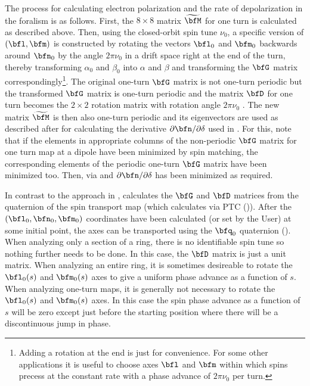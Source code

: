 {The process for calculating electron polarization and the rate of depolarization in the 
foralism is as follows. First, the $8 \times 8$ matrix $\widetilde\bfM$ for one turn is calculated
as described above. Then, using the closed-orbit spin tune $\nu_0$, a specific version of $(\bfl,
\bfm)$ is constructed by rotating the vectors $\bfl_0$ and $ \bfm_0$ backwards around $ \bfn_0$ by
the angle $2\pi \nu_0$ in a drift space right at the end of the turn, thereby transforming
$\alpha_0$ and $\beta_0$ into $\alpha$ and $\beta$ and transforming the $\bfG$ matrix
correspondingly\footnote{Adding a rotation at the end is just for convenience. For some other
applications it is useful to choose axes $ \bfl$ and $ \bfm$ within which spins precess at the
constant rate with a phase advance of $2\pi \nu_0$ per turn.}. The original one-turn $\bfG$ matrix
is not one-turn periodic but the transformed $\bfG$ matrix is one-turn periodic and the matrix
$\bfD$ for one turn becomes the $2 \times 2$ rotation matrix with rotation angle $2\pi \nu_0$
\cite{b:chao.spin}.  The new matrix $\widetilde \bfM$ is then also one-turn periodic and its
eigenvectors are used as described after  for calculating the derivative ${\partial
\bfn}/\partial \delta$ used in .  For this, note that if the elements in appropriate
columns of the non-periodic $\bfG$ matrix for one turn map at a dipole have been minimized by spin
matching, the corresponding elements of the periodic one-turn $\bfG$ matrix have been minimized
too. Then, via  and  $\partial\bfn/\partial\delta$ has been minimized as
required.

In contrast to the approach in \cite{b:barber85,b:barber99}, \bmad calculates the $\bfG$ and $\bfD$
matrices from the quaternion of the spin transport map (which \bmad calculates via PTC
()).  After the $(\bfl_0, \bfn_0, \bfm_0)$ coordinates have been calculated (or set by
the User) at some initial point, the axes can be transported using the $\bfq_0$ quaternion
(). When analyzing only a section of a ring, there is no identifiable spin tune so nothing
further needs to be done. In this case, the $\bfD$ matrix is just a unit matrix. When analyzing an
entire ring, it is sometimes desireable to rotate the $\bfl_0(s)$ and $\bfm_0(s)$ axes to give a
uniform phase advance as a function of $s$.  When analyzing one-turn maps, it is generally not
necessary to rotate the $\bfl_0(s)$ and $\bfm_0(s)$ axes. In this case the spin phase advance as a
function of $s$ will be zero except just before the starting position where there will be a
discontinuous jump in phase.

}
